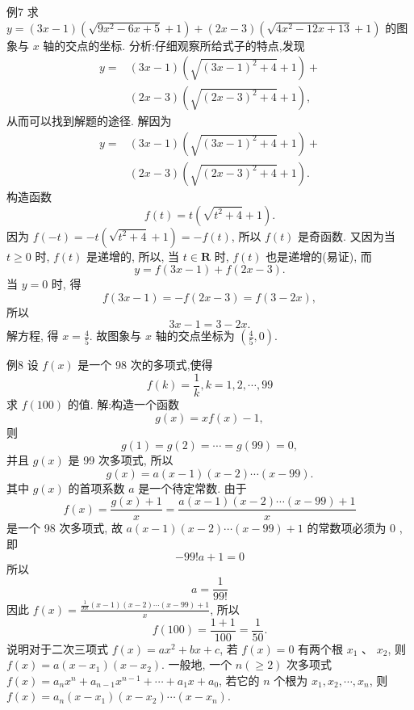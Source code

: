 例7 求 $y=(3 x-1)\left(\sqrt{9 x^2-6 x+5}+1\right)+(2 x-3) (\sqrt{4 x^2-12 x+13}+ 1)$ 的图象与 $x$ 轴的交点的坐标.
分析:仔细观察所给式子的特点,发现
$$
\begin{aligned}
y= & (3 x-1)\left(\sqrt{(3 x-1)^2+4}+1\right)+ \\
& (2 x-3)\left(\sqrt{(2 x-3)^2+4}+1\right),
\end{aligned}
$$
从而可以找到解题的途径.
解因为
$$
\begin{aligned}
y= & (3 x-1)\left(\sqrt{(3 x-1)^2+4}+1\right)+ \\
& (2 x-3)\left(\sqrt{(2 x-3)^2+4}+1\right) .
\end{aligned}
$$
构造函数
$$
f(t)=t\left(\sqrt{t^2+4}+1\right) .
$$
因为 $f(-t)=-t\left(\sqrt{t^2+4}+1\right)=-f(t)$, 所以 $f(t)$ 是奇函数.
又因为当 $t \geqslant 0$ 时, $f(t)$ 是递增的, 所以, 当 $t \in \mathbf{R}$ 时, $f(t)$ 也是递增的(易证), 而
$$
y=f(3 x-1)+f(2 x-3) .
$$
当 $y=0$ 时, 得
$$
f(3 x-1)=-f(2 x-3)=f(3-2 x),
$$
所以
$$
3 x-1=3-2 x .
$$
解方程, 得 $x=\frac{4}{5}$.
故图象与 $x$ 轴的交点坐标为 $\left(\frac{4}{5}, 0\right)$.



例8 设 $f(x)$ 是一个 98 次的多项式,使得
$$
f(k)=\frac{1}{k}, k=1,2, \cdots, 99
$$
求 $f(100)$ 的值.
解:构造一个函数
$$
g(x)=x f(x)-1,
$$
则
$$
g(1)=g(2)=\cdots=g(99)=0,
$$
并且 $g(x)$ 是 99 次多项式, 所以
$$
g(x)=a(x-1)(x-2) \cdots(x-99) .
$$
其中 $g(x)$ 的首项系数 $a$ 是一个待定常数.
由于
$$
f(x)=\frac{g(x)+1}{x}=\frac{a(x-1)(x-2) \cdots(x-99)+1}{x}
$$
是一个 98 次多项式, 故 $a(x-1)(x-2) \cdots(x-99)+1$ 的常数项必须为 0 , 即
$$
-99 ! a+1=0
$$
所以
$$
a=\frac{1}{99 !}
$$
因此 $f(x)=\frac{\frac{1}{99 !}(x-1)(x-2) \cdots(x-99)+1}{x}$, 所以
$$
f(100)=\frac{1+1}{100}=\frac{1}{50} .
$$
说明对于二次三项式 $f(x)=a x^2+b x+c$, 若 $f(x)=0$ 有两个根 $x_1$ 、 $x_2$, 则 $f(x)=a\left(x-x_1\right)\left(x-x_2\right)$. 一般地, 一个 $n(\geqslant 2)$ 次多项式 $f(x)= a_n x^n+a_{n-1} x^{n-1}+\cdots+a_1 x+a_0$, 若它的 $n$ 个根为 $x_1, x_2, \cdots, x_n$, 则 $f(x)= a_n\left(x-x_1\right)\left(x-x_2\right) \cdots\left(x-x_n\right)$.



